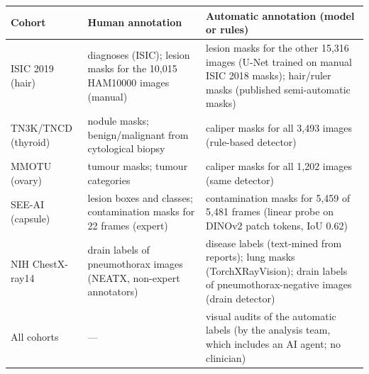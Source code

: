 \begin{center}\scriptsize\begin{tabular}{p{2.6cm}p{5.2cm}p{6.8cm}}\toprule
Cohort & Human annotation & Automatic annotation (model or rules) \\\midrule
ISIC 2019 (hair) & diagnoses (ISIC); lesion masks for the 10,015 HAM10000 images (manual) & lesion masks for the other 15,316 images (U-Net trained on manual ISIC 2018 masks); hair/ruler masks (published semi-automatic masks) \\
TN3K/TNCD (thyroid) & nodule masks; benign/malignant from cytological biopsy & caliper masks for all 3,493 images (rule-based detector) \\
MMOTU (ovary) & tumour masks; tumour categories & caliper masks for all 1,202 images (same detector) \\
SEE-AI (capsule) & lesion boxes and classes; contamination masks for 22 frames (expert) & contamination masks for 5,459 of 5,481 frames (linear probe on DINOv2 patch tokens, IoU 0.62) \\
NIH ChestX-ray14 & drain labels of pneumothorax images (NEATX, non-expert annotators) & disease labels (text-mined from reports); lung masks (TorchXRayVision); drain labels of pneumothorax-negative images (drain detector) \\
All cohorts & --- & visual audits of the automatic labels (by the analysis team, which includes an AI agent; no clinician) \\
\bottomrule\end{tabular}\end{center}
